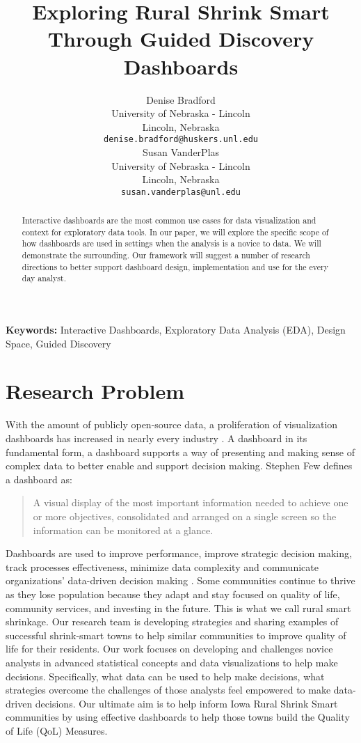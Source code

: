 \documentclass[10pt]{article}
\title{Exploring Rural Shrink Smart Through Guided Discovery Dashboards}
\author{
  Denise Bradford \\
  University of Nebraska - Lincoln \\
  Lincoln, Nebraska \\
  {\tt denise.bradford@huskers.unl.edu} \\\And
  Susan VanderPlas \\
  University of Nebraska - Lincoln \\
  Lincoln, Nebraska \\
  {\tt susan.vanderplas@unl.edu} \\}
\date{}
\begin{document}


\begin{Schunk}
\end{Schunk}


\maketitle
\begin{abstract}
Interactive dashboards are the most common use cases for data visualization and context for exploratory data tools. In our paper, we will explore the specific scope of how dashboards are used in settings when the analysis is a novice to data. We will demonstrate the surrounding. Our framework will suggest a number of research directions to better support dashboard design, implementation and use for the every day analyst. 
\end{abstract}

{\bf Keywords:} Interactive Dashboards, Exploratory Data Analysis (EDA), Design Space, Guided Discovery

\section{Research Problem}
With the amount of publicly open-source data, a proliferation of visualization dashboards has increased in nearly every industry \cite{Fisher}. A dashboard in its fundamental form, a dashboard supports a way of presenting and making sense of complex data to better enable and support decision making. Stephen Few defines a dashboard as:
\begin{quotation}
\small A visual display of the most important information needed to achieve one or more objectives, consolidated and arranged on a single screen so the information can be monitored at a glance. \cite{Few}
\end{quotation}
Dashboards are used to improve performance, improve strategic decision making, track processes effectiveness, minimize data complexity and communicate organizations' data-driven decision making \cite{...}.
Some communities continue to thrive as they lose population because they adapt and stay focused on quality of life, community services, and investing in the future. This is what we call rural smart shrinkage. Our research team is developing strategies and sharing examples of successful shrink-smart towns to help similar communities to improve quality of life for their residents\cite{SCC}. Our work focuses on developing and challenges novice analysts in advanced statistical concepts and data visualizations to help make decisions. Specifically, what data can be used to help make decisions, what strategies overcome the challenges of those analysts feel empowered to make data-driven decisions. Our ultimate aim is to help inform Iowa Rural Shrink Smart communities by using effective dashboards to help those towns build the Quality of Life (QoL) Measures.
\end{document}
